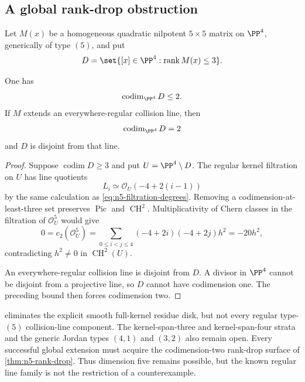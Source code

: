 \subsection{A global rank-drop obstruction}

Let \(M(x)\) be a homogeneous quadratic nilpotent \(5\times5\) matrix on
\(\PP^4\), generically of type \((5)\), and put
\[
D=\set{[x]\in\PP^4:\operatorname{rank}M(x)\le3}.
\]

\begin{theorem}
\label{thm:n5-rank-drop}
One has
\[
\operatorname{codim}_{\PP^4}D\le2.
\]
If \(M\) extends an everywhere-regular collision line, then
\[
\operatorname{codim}_{\PP^4}D=2
\]
and \(D\) is disjoint from that line.
\end{theorem}

\begin{proof}
Suppose \(\operatorname{codim}D\ge3\) and put
\(U=\PP^4\setminus D\).  The regular kernel filtration on \(U\) has line
quotients
\[
L_i\simeq\mathcal O_U(-4+2(i-1))
\]
by the same calculation as \eqref{eq:n5-filtration-degrees}.  Removing a
codimension-at-least-three set preserves \(\operatorname{Pic}\) and
\(\operatorname{CH}^2\).  Multiplicativity of Chern classes in the
filtration of \(\mathcal O_U^5\) would give
\[
0=c_2(\mathcal O_U^5)
=\sum_{0\le i<j\le4}(-4+2i)(-4+2j)h^2
=-20h^2,
\]
contradicting \(h^2\ne0\) in \(\operatorname{CH}^2(U)\).

An everywhere-regular collision line is disjoint from \(D\).  A divisor in
\(\PP^4\) cannot be disjoint from a projective line, so \(D\) cannot have
codimension one.  The preceding bound then forces codimension two.
\end{proof}

\begin{remark}
 eliminates the explicit smooth full-kernel
residue disk, but not every regular type-\((5)\) collision-line component.
The kernel-span-three and kernel-span-four strata and the generic Jordan
types \((4,1)\) and \((3,2)\) also remain open.  Every successful global
extension must acquire the codimension-two rank-drop surface of
\cref{thm:n5-rank-drop}.  Thus dimension five remains possible, but the
known regular line family is not the restriction of a counterexample.
\end{remark}
